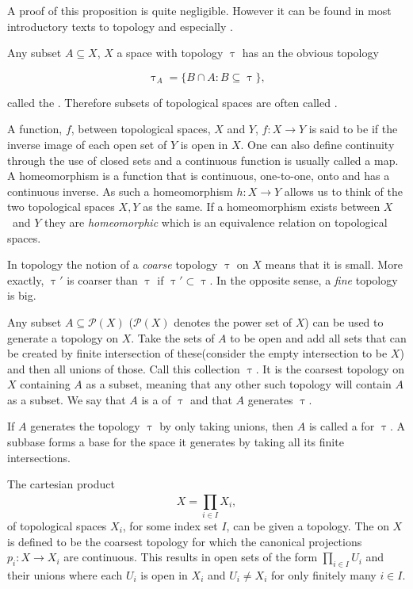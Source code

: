 \documentclass[../../main.tex]{subfiles}
\begin{document}
    A proof of this proposition is quite negligible. However it can be found in most introductory texts to topology and especially \cite{armstrong-basictop}.

    Any subset $A \subseteq X$, $X$ a space with topology $\uptau$ has an the obvious topology 

    \begin{equation*}
        \uptau_A = \{B \cap A: B \subseteq \uptau\},
    \end{equation*}

    called the . Therefore subsets of topological spaces are often called .
    
    A function, $f$, between topological spaces, $X$ and $Y$, $f:X\to Y$ is said to be  if the inverse image of each open set of $Y$ is open in $X$. One can also define continuity through the use of closed sets and a continuous function is usually called a map. A homeomorphism is a function that is continuous, one-to-one, onto and has a continuous inverse. As such a homeomorphism $h:X\to Y$ allows us to think of the two topological spaces $X, Y$ as the same. If a homeomorphism exists between $X$ and $Y$ they are \emph{homeomorphic} which is an equivalence relation on topological spaces.

    In topology the notion of a \textit{coarse} topology $\uptau$ on $X$ means that it is small. More exactly, $\uptau'$ is coarser than $\uptau$ if $\uptau' \subset \uptau$. In the opposite sense, a \textit{fine} topology is big.
    
    Any subset $A \subseteq \mathcal{P}(X)$ ($\mathcal{P}(X)$ denotes the power set of $X$) can be used to generate a topology on $X$. Take the sets of $A$ to be open and add all sets that can be created by finite intersection of these(consider the empty intersection to be $X$) and then all unions of those. Call this collection $\uptau$. It is the coarsest topology on $X$ containing $A$ as a subset, meaning that any other such topology will contain $A$ as a subset. We say that $A$ is a  of $\uptau$ and that $A$ generates $\uptau$.
    
    If $A$ generates the topology $\uptau$ by only taking unions, then $A$ is called a  for $\uptau$. A subbase forms a base for the space it generates by taking all its finite intersections.
    
    \begin{definition}\label{top-prod}
        The cartesian product \[X=\prod_{i\in I}^{}X_i,\] of topological spaces $X_i$, for some index set $I$, can be given a topology. The  on $X$ is defined to be the coarsest topology for which the canonical projections $p_i:X\to X_i$ are continuous. This results in open sets of the form $ \prod_{i\in I}U_i$ and their unions where each $U_i$ is open in $X_i$ and $U_i \ne X_i$ for only finitely many $i\in I$.
    \end{definition}
\end{document}
